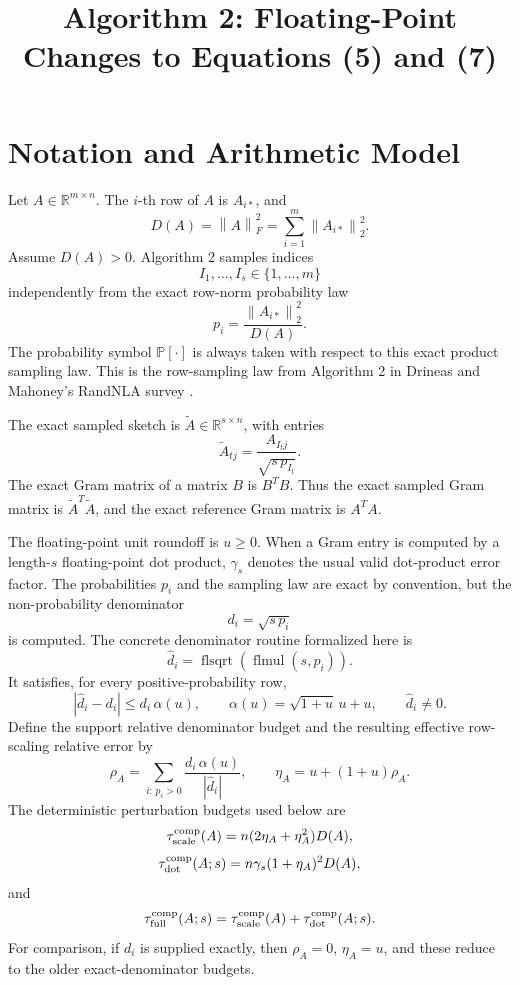 \documentclass[11pt]{article}
\title{Algorithm 2: Floating-Point Changes to Equations (5) and (7)}
\author{}
\date{}
\newcommand{\R}{\mathbb{R}}
\newcommand{\Prob}{\mathbb{P}}
\newcommand{\Frob}[1]{\left\lVert #1\right\rVert_F}
\newcommand{\Norm}[1]{\left\lVert #1\right\rVert_2}
\newcommand{\Atil}{\widetilde A}
\theoremstyle{remark}
\begin{document}
\sloppy

\maketitle

\section*{Notation and Arithmetic Model}

Let \(A\in\R^{m\times n}\).  The \(i\)-th row of \(A\) is \(A_{i*}\), and
\[
  D(A)=\Frob{A}^2=\sum_{i=1}^m \Norm{A_{i*}}^2 .
\]
Assume \(D(A)>0\).  Algorithm 2 samples indices
\[
  I_1,\ldots,I_s\in\{1,\ldots,m\}
\]
independently from the exact row-norm probability law
\[
  p_i=\frac{\Norm{A_{i*}}^2}{D(A)}.
\]
The probability symbol \(\Prob[\cdot]\) is always taken with respect to this
exact product sampling law.  This is the row-sampling law from Algorithm 2 in
Drineas and Mahoney's RandNLA survey \cite{DrineasMahoney2016RandNLA}.

The exact sampled sketch is \(\Atil\in\R^{s\times n}\), with entries
\[
  \Atil_{tj}=\frac{A_{I_tj}}{\sqrt{s\,p_{I_t}}}.
\]
The exact Gram matrix of a matrix \(B\) is \(B^TB\).  Thus the exact sampled
Gram matrix is \(\Atil^T\Atil\), and the exact reference Gram matrix is
\(A^TA\).

The floating-point unit roundoff is \(u\ge0\).  When a Gram entry is computed
by a length-\(s\) floating-point dot product, \(\gamma_s\) denotes the usual
valid dot-product error factor.  The probabilities \(p_i\) and the sampling law
are exact by convention, but the non-probability denominator
\[
  d_i=\sqrt{s\,p_i}
\]
is computed.  The concrete denominator routine formalized here is
\[
  \widehat d_i=\operatorname{flsqrt}(\operatorname{flmul}(s,p_i)).
\]
It satisfies, for every positive-probability row,
\[
  |\widehat d_i-d_i|
  \le
  d_i\,\alpha(u),
  \qquad
  \alpha(u)=\sqrt{1+u}\,u+u,
  \qquad
  \widehat d_i\ne0.
\]
Define the support relative denominator budget and the resulting effective
row-scaling relative error by
\[
  \rho_A
  =
  \sum_{i:\,p_i>0}
    \frac{d_i\,\alpha(u)}{|\widehat d_i|},
  \qquad
  \eta_A
  =
  u+(1+u)\rho_A .
\]
The deterministic perturbation budgets used below are
\[
  \tau_{\rm scale}^{\rm comp}(A)
  =
  n(2\eta_A+\eta_A^2)D(A),
\]
\[
  \tau_{\rm dot}^{\rm comp}(A;s)
  =
  n\gamma_s(1+\eta_A)^2D(A),
\]
and
\[
  \tau_{\rm full}^{\rm comp}(A;s)
  =
  \tau_{\rm scale}^{\rm comp}(A)+\tau_{\rm dot}^{\rm comp}(A;s).
\]
For comparison, if \(d_i\) is supplied exactly, then \(\rho_A=0\),
\(\eta_A=u\), and these reduce to the older exact-denominator budgets.
\end{document}
